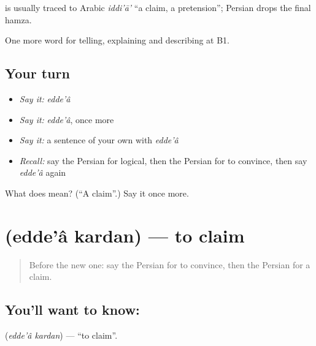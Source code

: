 \begin{cousinweb}
\textbf{} is usually traced to Arabic \emph{iddi'ā'} \textquotedblleft{}a claim, a pretension\textquotedblright{}; Persian drops the final hamza.
\end{cousinweb}

\begin{grammarlens}[title={What you've built}]
One more word for telling, explaining and describing at B1.
\end{grammarlens}

\subsection*{Your turn}
\begin{itemize}
\raggedright
  \item \emph{Say it:} \emph{edde'â}
  \item \emph{Say it:} \emph{edde'â}, once more
  \item \emph{Say it:} a sentence of your own with \emph{edde'â}
  \item \emph{Recall:} say the Persian for logical, then the Persian for to convince, then say \emph{edde'â} again
\end{itemize}

\begin{tcolorbox}[breakable,colback=teal!4,colframe=teal!35!black,title={Before you move on}]
What does  mean? (\textquotedblleft{}A claim\textquotedblright{}.) Say it once more.
\end{tcolorbox}
\section[\texorpdfstring{\fa{ادعا} \fa{کردن} (edde'â kardan)}{ادعا کردن (edde'â kardan)}]{  (edde'â kardan) — to claim}

\label{lesson:FA-C363-eddea-kardan}



\begin{quote}
Before the new one: say the Persian for to convince, then the Persian for a claim.
\end{quote}

\subsection*{You'll want to know:  }
\textbf{ } (\emph{edde'â kardan}) — \textquotedblleft{}to claim\textquotedblright{}.

